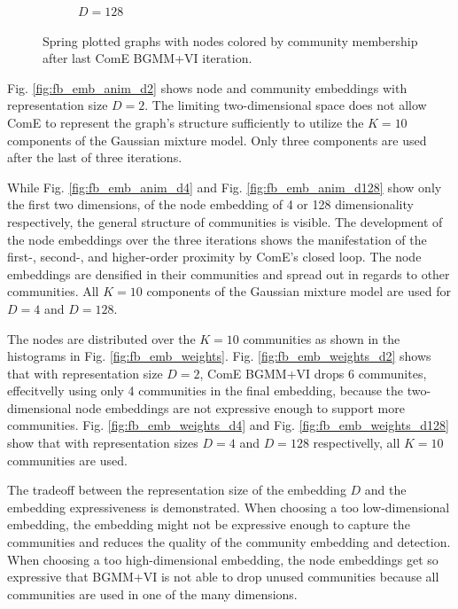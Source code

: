 \documentclass[conference]{IEEEtran}
\begin{document}
\begin{figure}[htbp]
\begin{subfigure}{.33\textwidth}
        \caption{$D=128$}
    \end{subfigure}%
    \caption{Spring plotted graphs with nodes colored by community membership after last ComE BGMM+VI iteration.}
    \label{fig:fb_graphs}
\end{figure}

Fig. \ref{fig:fb_emb_anim_d2} shows node and community embeddings with representation size $D=2$. The limiting two-dimensional space does not allow ComE to represent the \citet{social_circles_fb} graph's structure sufficiently to utilize the $K=10$ components of the Gaussian mixture model. Only three components are used after the last of three iterations.

While Fig. \ref{fig:fb_emb_anim_d4} and Fig. \ref{fig:fb_emb_anim_d128} show only the first two dimensions, of the node embedding of 4 or 128 dimensionality respectively, the general structure of communities is visible. The development of the node embeddings over the three iterations shows the manifestation of the first-, second-, and higher-order proximity by ComE's closed loop. The node embeddings are densified in their communities and spread out in regards to other communities. All $K=10$ components of the Gaussian mixture model are used for $D=4$ and $D=128$.

The nodes are distributed over the $K=10$ communities as shown in the histograms in Fig. \ref{fig:fb_emb_weights}. Fig. \ref{fig:fb_emb_weights_d2} shows that with representation size $D=2$, ComE BGMM+VI drops 6 communites, effecitvelly using only 4 communities in the final embedding, because the two-dimensional node embeddings are not expressive enough to support more communities. Fig. \ref{fig:fb_emb_weights_d4} and Fig. \ref{fig:fb_emb_weights_d128} show that with representation sizes $D=4$ and $D=128$ respectivelly, all $K=10$ communities are used.

The tradeoff between the representation size of the embedding $D$ and the embedding expressiveness is demonstrated. When choosing a too low-dimensional embedding, the embedding might not be expressive enough to capture the communities and reduces the quality of the community embedding and detection. When choosing a too high-dimensional embedding, the node embeddings get so expressive that BGMM+VI is not able to drop unused communities because all communities are used in one of the many dimensions.
\end{document}
